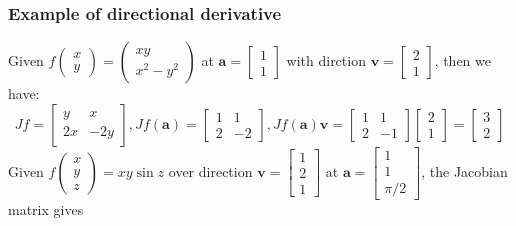 \documentclass{article}
\begin{document}
\subsubsection{Example of directional derivative}
Given $f\begin{pmatrix}
    x\\
    y
\end{pmatrix} = \begin{pmatrix}
    xy\\
    x^2 - y^2
\end{pmatrix}$ at $\mathbf{a} = \begin{bmatrix}
    1\\
    1
\end{bmatrix}$ with dirction $\mathbf{v} = \begin{bmatrix}
    2\\
    1
\end{bmatrix}$, then we have:
\begin{equation*}
    Jf = \begin{bmatrix}
        y& x\\
        2x& -2y
    \end{bmatrix}, Jf(\mathbf{a}) = \begin{bmatrix}
        1& 1\\
        2& -2
    \end{bmatrix}, Jf(\mathbf{a})\mathbf{v} = \begin{bmatrix}
        1& 1\\
        2& -1
    \end{bmatrix}\begin{bmatrix}
        2\\
        1
    \end{bmatrix} = \begin{bmatrix}
        3\\
        2
    \end{bmatrix}
\end{equation*}
Given $f\begin{pmatrix}
    x\\
    y\\
    z
\end{pmatrix} = xy\sin z$ over direction $\mathbf{v} = \begin{bmatrix}
    1\\
    2\\
    1
\end{bmatrix}$ at $\mathbf{a} = \begin{bmatrix}
    1\\
    1\\
    \pi / 2
\end{bmatrix}$, the Jacobian matrix gives
\end{document}
